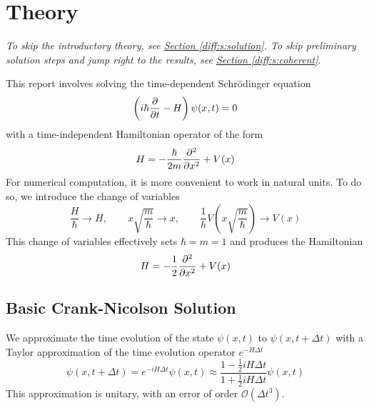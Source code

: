 \documentclass[11pt, a4paper]{article}
\newcommand{\schro}{Schr\"{o}dinger\xspace}
\begin{document}
\newpage


\section{Theory} \label{diff:s:theory}
\vspace{-2mm}
\textit{To skip the introductory theory, see \hyperref[diff:s:solution]{Section \ref{diff:s:solution}}. To skip preliminary solution steps and jump right to the results, see \hyperref[diff:s:coherent]{Section \ref{diff:s:coherent}}}.

\vspace{2mm}

This report involves solving the time-dependent \schro equation
\begin{equation*}
	\left(i \hbar \pdv{t} - H\right) \psi(x, t) = 0
\end{equation*}
with a time-independent Hamiltonian operator of the form
\begin{equation*}
	H = - \frac{\hbar}{2m}\pdv[2]{}{x} + V(x)
\end{equation*}
For numerical computation, it is more convenient to work in natural units. To do so, we introduce the change of variables
\begin{equation*}
	\frac{H}{\hbar} \to H, \qquad x \sqrt{\frac{m}{\hbar}} \to x, \qquad \frac{1}{h}V\left(x\sqrt{\frac{m}{\hbar}}\right) \to V(x)
\end{equation*}
This change of variables effectively sets $ \hbar = m = 1 $ and produces the Hamiltonian
\begin{equation}
	H = - \frac{1}{2}\pdv[2]{}{x} + V(x) \label{diff:eqn:H-dimensionless}
\end{equation}

\subsection{Basic Crank-Nicolson Solution}  \label{diff:ss:CN-basic}
We approximate the time evolution of the state $ \psi(x, t) $ to $ \psi(x, t + \Delta t) $ with a Taylor approximation of the time evolution operator $ e^{-H \Delta t} $
\begin{equation}
	\psi(x, t + \Delta t) = e^{-iH\Delta t}\psi(x, t) \approx \frac{1 - \tfrac{1}{2}iH\Delta t}{1 + \tfrac{1}{2}iH\Delta t}\psi(x, t) \label{diff:eq:schro-approx}
\end{equation}
This approximation is unitary, with an error of order $ \mathcal{O}(\Delta t^{3}) $. 
\end{document}
